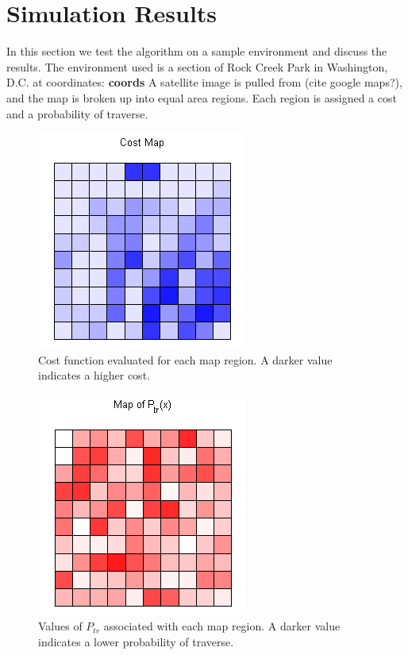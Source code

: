 \documentclass[journal]{IEEEtran}
\begin{document}


\section{Simulation Results}
In this section we test the algorithm on a sample environment and discuss the results. The environment used is a section of Rock Creek Park in Washington, D.C. at coordinates: \textbf{coords}
A satellite image is pulled from (cite google maps?), and the map is broken up into equal area regions.
Each region is assigned a cost and a probability of traverse.

\begin{figure}[h!]
\label{cost_map}
\centering
\includegraphics[scale=1.5]{cost_map}
\caption{Cost function evaluated for each map region. A darker value indicates a higher cost.}
\end{figure}

\begin{figure}[h!]
\label{Ptr_map}
\centering
\includegraphics[scale=1]{P_tr_map}
\caption{Values of $P_{tr}$ associated with each map region. A darker value indicates a lower probability of traverse.}

\end{figure}
\end{document}
